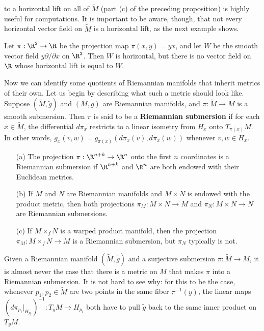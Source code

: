 to a horizontal lift on all of $\widetilde{M}$ (part (c) of the preceding 
proposition) is highly useful for computations. It is important to be aware, 
though, that not every horizontal vector field on $\widetilde{M}$ is a horizontal 
lift, as the next example shows.
\begin{example}
Let $\pi:\R^2\to\R$ be the projection map $\pi(x,y)=yx$, and let $W$ be the smooth vector 
field $y\partial/\partial x$ on $\R^2$. Then $W$ is horizontal, but there is no 
vector field on $\R$ whose horizontal lift is equal to $W$.
\end{example}
Now we can identify some quotients of Riemannian manifolds that inherit metrics 
of their own. Let us begin by describing what such a metric should look like. 
Suppose $(\widetilde{M},\widetilde{g})$ and $(M,g)$ are Riemannian manifolds, 
and $\pi:\widetilde{M}\to M$ is a smooth submersion. Then $\pi$ is said to be 
a \textbf{Riemannian submersion} if for each $x\in\widetilde{M}$, the differential 
$d\pi_x$ restricts to a linear isometry from $H_x$ onto $T_{\pi(x)}M$. In other 
words, $\widetilde{g}_x(v,w)=g_{\pi(x)}(d\pi_x(v),d\pi_x(w))$ whenever $v,w\in H_x$.
\begin{example}
\mbox{}
\begin{itemize}
\item[(a)] The projection $\pi:\R^{n+k}\to\R^n$ onto the first $n$ coordinates is 
a Riemannian submersion if $\R^{n+k}$ and $\R^n$ are both endowed with their 
Euclidean metrics.
\item[(b)] If $M$ and $N$ are Riemannian manifolds and $M\times N$ is endowed 
with the product metric, then both projections $\pi_M:M\times N\to M$ and $\pi_N:M\times N\to N$ 
are Riemannian submersions.
\item[(c)] If $M\times_fN$ is a warped product manifold, then the projection $\pi_M:M\times_fN\to M$ 
is a Riemannian submersion, but $\pi_N$ typically is not.
\end{itemize}
\end{example}
Given a Riemannian manifold $(\widetilde{M},\widetilde{g})$ and a surjective 
submersion $\pi:\widetilde{M}\to M$, it is almost never the case that there is 
a metric on $M$ that makes $\pi$ into a Riemannian submersion. It is not hard 
to see why: for this to be the case, whenever $p_1,p_2\in\widetilde{M}$ are two points in 
the same fiber $\pi^{-1}(y)$, the linear maps $(d\pi_{p_i}|_{H_{p_i}})^{-1}:T_yM\to H_{p_i}$ 
both have to pull $\widetilde{g}$ back to the same inner product on $T_yM$.
